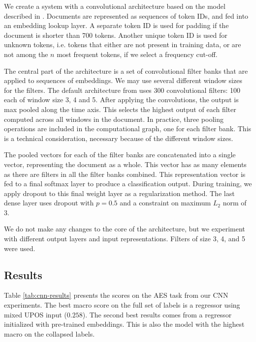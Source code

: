 We create a system with a convolutional architecture based on the model
described in \textcite{kim2014convolutional}. Documents are represented as
sequences of token IDs, and fed into an embedding lookup layer. A separate
token ID is used for padding if the document is shorter than 700 tokens.
Another unique token ID is used for unknown tokens, i.e. tokens that either
are not present in training data, or are not among the $n$ most frequent
tokens, if we select a frequency cut-off.

The central part of the architecture is a set of convolutional filter banks
that are applied to sequences of embeddings. We may use several different
window sizes for the filters. The default architecture from
\textcite{kim2014convolutional} uses 300 convolutional filters: 100 each of
window size 3, 4 and 5. After applying the convolutions, the output is max
pooled along the time axis. This selects the highest output of each filter
computed across all windows in the document. In practice, three pooling
operations are included in the computational graph, one for each filter bank.
This is a technical consideration, necessary because of the different window
sizes.

The pooled vectors for each of the filter banks are concatenated into a
single vector, representing the document as a whole. This vector has as many
elements as there are filters in all the filter banks combined. This
representation vector is fed to a final softmax layer to produce a
classification output. During training, we apply dropout to this final weight
layer as a regularization method. The last dense layer uses dropout with
$p=0.5$ and a constraint on maximum $L_2$ norm of 3.

We do not make any changes to the core of the
\citeauthor{kim2014convolutional} architecture, but we experiment with
different output layers and input representations. Filters of size 3, 4, and
5 were used.


\subsection{Results}

Table \ref{tab:cnn-results} presents the \FI scores on the \ac{AES} task from
our \ac{CNN} experiments. The best macro \FI score on the full set of labels
is a regressor using mixed UPOS input ($0.258$). The second best results comes
from a regressor initialized with pre-trained embeddings. This is also the
model with the highest macro \FI on the collapsed labels. 

